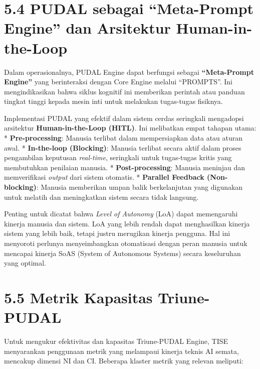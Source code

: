 \documentclass[
  letterpaper,
  DIV=11,
  numbers=noendperiod]{scrreprt}
\begin{document}
\section{\texorpdfstring{\textbf{5.4 PUDAL sebagai ``Meta-Prompt
Engine'' dan Arsitektur
Human-in-the-Loop}}{5.4 PUDAL sebagai ``Meta-Prompt Engine'' dan Arsitektur Human-in-the-Loop}}\label{pudal-sebagai-meta-prompt-engine-dan-arsitektur-human-in-the-loop}

Dalam operasionalnya, PUDAL Engine dapat berfungsi sebagai
\textbf{``Meta-Prompt Engine''} yang berinteraksi dengan Core Engine
melalui ``PROMPTS''. Ini mengindikasikan bahwa siklus kognitif ini
memberikan perintah atau panduan tingkat tinggi kepada mesin inti untuk
melakukan tugas-tugas fisiknya.

Implementasi PUDAL yang efektif dalam sistem cerdas seringkali
mengadopsi arsitektur \textbf{Human-in-the-Loop (HITL)}. Ini melibatkan
empat tahapan utama: * \textbf{Pre-processing}: Manusia terlibat dalam
mempersiapkan data atau aturan awal. * \textbf{In-the-loop (Blocking)}:
Manusia terlibat secara aktif dalam proses pengambilan keputusan
\emph{real-time}, seringkali untuk tugas-tugas kritis yang membutuhkan
penilaian manusia. * \textbf{Post-processing}: Manusia meninjau dan
memverifikasi \emph{output} dari sistem otomatis. * \textbf{Parallel
Feedback (Non-blocking)}: Manusia memberikan umpan balik berkelanjutan
yang digunakan untuk melatih dan meningkatkan sistem secara tidak
langsung.

Penting untuk dicatat bahwa \emph{Level of Autonomy} (LoA) dapat
memengaruhi kinerja manusia dan sistem. LoA yang lebih rendah dapat
menghasilkan kinerja sistem yang lebih baik, tetapi justru merugikan
kinerja pengguna. Hal ini menyoroti perlunya menyeimbangkan otomatisasi
dengan peran manusia untuk mencapai kinerja SoAS (System of Autonomous
Systems) secara keseluruhan yang optimal.

\section{\texorpdfstring{\textbf{5.5 Metrik Kapasitas
Triune-PUDAL}}{5.5 Metrik Kapasitas Triune-PUDAL}}\label{metrik-kapasitas-triune-pudal}

Untuk mengukur efektivitas dan kapasitas Triune-PUDAL Engine, TISE
menyarankan penggunaan metrik yang melampaui kinerja teknis AI semata,
mencakup dimensi NI dan CI. Beberapa klaster metrik yang relevan
meliputi:
\end{document}
